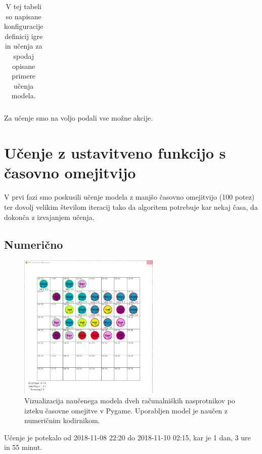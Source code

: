 \documentclass[a4paper, 12pt]{book}
\begin{document}
\begin{table}
\begin{center}
\begin{tabular}{p{0.4\linewidth}|p{0.1\linewidth}|p{0.1\linewidth}|p{0.1\linewidth}|p{0.1\linewidth}}
		\end{tabular}
	\end{center}
	\caption{V tej tabeli so napisane konfiguracije definicij igre in učenja za spodaj opisane primere učenja modela.}
	\label{tabelLearnConfig}
\end{table}

Za učenje smo na voljo podali vse možne akcije.

\section{Učenje z ustavitveno funkcijo s časovno omejitvijo}
\label{resultFirst}
V prvi fazi smo poskusili učenje modela z manjšo časovno omejitvijo (100 potez) ter dovolj velikim številom iteracij tako da algoritem potrebuje kar nekaj časa, da dokonča z izvajanjem učenja.


\subsection{Numerično}

\begin{figure}[h]
	\begin{center}
		\includegraphics[width=0.6\textwidth]{photos/first-numeric.pdf}
	\end{center}
	\caption{Vizualizacija naučenega modela dveh računalniških nasprotnikov po izteku časovne omejitve v Pygame. 
		Uporabljen model je naučen z numeričnim kodirnikom.}
	\label{vizualizacijaRezultatovNumericniKodirnik100Timeout}
\end{figure}

Učenje je potekalo od 2018-11-08 22:20 do 2018-11-10 02:15, kar je 1 dan, 3 ure in 55 minut.
\end{document}
